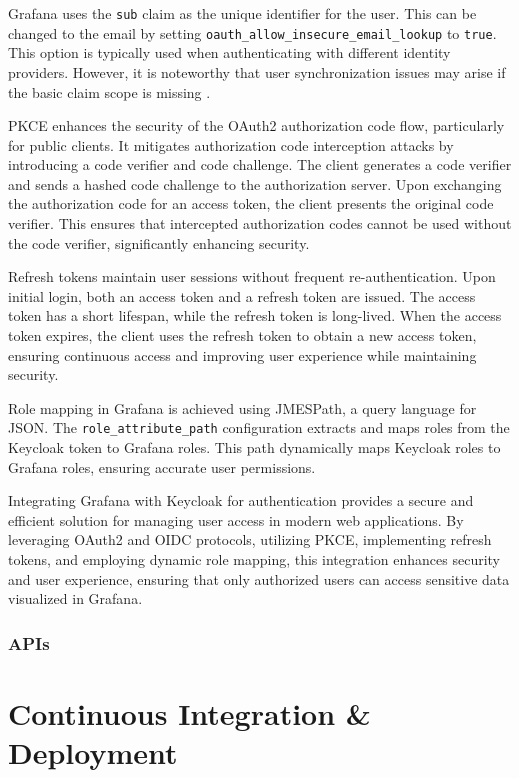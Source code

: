 Grafana uses the \texttt{sub} claim as the unique identifier for the user. This can be changed to the email by setting \texttt{oauth\_allow\_insecure\_email\_lookup} to \texttt{true}. This option is typically used when authenticating with different identity providers. However, it is noteworthy that user synchronization issues may arise if the basic claim scope is missing \parencite{grafana_authentication}.

PKCE enhances the security of the OAuth2 authorization code flow, particularly for public clients. It mitigates authorization code interception attacks by introducing a code verifier and code challenge. The client generates a code verifier and sends a hashed code challenge to the authorization server. Upon exchanging the authorization code for an access token, the client presents the original code verifier. This ensures that intercepted authorization codes cannot be used without the code verifier, significantly enhancing security.

Refresh tokens maintain user sessions without frequent re-authentication. Upon initial login, both an access token and a refresh token are issued. The access token has a short lifespan, while the refresh token is long-lived. When the access token expires, the client uses the refresh token to obtain a new access token, ensuring continuous access and improving user experience while maintaining security.

Role mapping in Grafana is achieved using JMESPath, a query language for JSON. The \texttt{role\_attribute\_path} configuration extracts and maps roles from the Keycloak token to Grafana roles. This path dynamically maps Keycloak roles to Grafana roles, ensuring accurate user permissions.

Integrating Grafana with Keycloak for authentication provides a secure and efficient solution for managing user access in modern web applications. By leveraging OAuth2 and OIDC protocols, utilizing PKCE, implementing refresh tokens, and employing dynamic role mapping, this integration enhances security and user experience, ensuring that only authorized users can access sensitive data visualized in Grafana.

\subsection{APIs}

\chapter{Continuous Integration \& Deployment}

